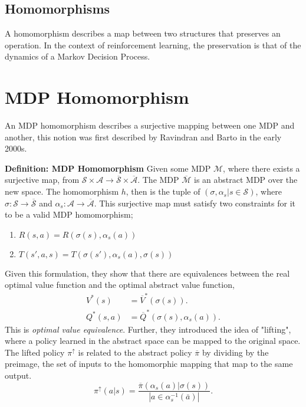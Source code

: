 \subsection{Homomorphisms}
A homomorphism describes a map between two structures that preserves an operation. In the context of reinforcement learning, the preservation is that of the dynamics of a Markov Decision Process.

\section{MDP Homomorphism}
An MDP homomorphism describes a surjective mapping between one MDP and another, this notion was first described by Ravindran and Barto in the early 2000s\cite{ravindran2003smdp,ravindran2001symmetries}.

\textbf{Definition: MDP Homomorphism} Given some MDP $\mathcal{M}$, where there exists a surjective map, from $\mathcal{S} \times \mathcal{A} \rightarrow \overline{\mathcal{S}} \times \overline{\mathcal{A}}$. The MDP $\overline{\mathcal{M}}$ is an abstract MDP over the new space. The homomorphism $h$, then is the tuple of $(\sigma, \alpha_s|s \in \mathcal{S})$, where $\sigma: \mathcal{S} \rightarrow \overline{\mathcal{S}}$ and $\alpha_s : \mathcal{A} \rightarrow \overline{\mathcal{A}}$. This surjective map must satisfy two constraints for it to be a valid MDP homomorphism;
\begin{enumerate}
	\item $R(s, a) = R(\sigma(s), \alpha_s(a))$
	\item $T(s', a, s) = T(\sigma(s'), \alpha_s(a), \sigma(s))$
\end{enumerate}

Given this formulation, they show that there are equivalences between the real optimal value function and the optimal abstract value function,
\begin{align*}
	V^*(s)    & = \overline{V}^*(\sigma(s)).              \\
	Q^*(s, a) & = \overline{Q}^*(\sigma(s), \alpha_s(a)).
\end{align*}
This is \textit{optimal value equivalence}. Further, they introduced the idea of "lifting", where a policy learned in the abstract space can be mapped to the original space. The lifted policy $\pi^\uparrow$ is related to the abstract policy $\overline{\pi}$ by dividing by the preimage, the set of inputs to the homomorphic mapping that map to the same output.
\begin{equation}
	\pi^\uparrow(a | s) = \frac{\overline{\pi}(\alpha_s(a) | \sigma(s))}{| a \in \alpha^{-1}_s(\bar{a})|}.
\end{equation}

